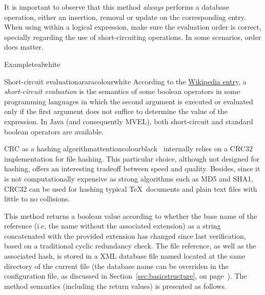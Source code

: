 \begin{description}
\vspace{1.4em}

It is important to observe that this method \emph{always} performs a database operation, either an insertion, removal or update on the corresponding entry. When using  within a logical expression, make sure the evaluation order is correct, specially regarding the use of short-circuiting operations. In some scenarios, order does matter.

\begin{codebox}{Example}{teal}{\icnote}{white}
\end{codebox}

\begin{messagebox}{Short-circuit evaluation}{araracolour}{\icok}{white}
According to the \href{https://en.wikipedia.org/wiki/Short-circuit_evaluation}{Wikipedia entry}, a \emph{short-circuit evaluation} is the semantics of some boolean operators in some programming languages in which the second argument is executed or evaluated only if the first argument does not suffice to determine the value of the expression. In Java (and consequently MVEL), both short-circuit and standard boolean operators are available.
\end{messagebox}

\begin{messagebox}{CRC as a hashing algorithm}{attentioncolour}{\icattention}{black}
\arara\ internally relies on a CRC32 implementation for file hashing. This particular choice, although not designed for hashing, offers an interesting tradeoff between speed and quality. Besides, since it is not computationally expensive as strong algorithms such as MD5 and SHA1, CRC32 can be used for hashing typical \TeX\ documents and plain text files with little to no collisions.
\end{messagebox}

\item[\mddbox{C}{R}{changed(String extension)}{boolean}] This method returns a boolean value according to whether the base name of the  reference (i.e, the name without the associated extension) as a string concatenated with the provided  extension has changed since last verification, based on a traditional cyclic redundancy check. The file reference, as well as the associated hash, is stored in a XML database file named  located at the same directory of the current file (the database name can be overriden in the configuration file, as discussed in Section~\ref{sec:basicstructure}, on page~\pageref{sec:basicstructure}). The method semantics (including the return values) is presented as follows.


\end{description}
